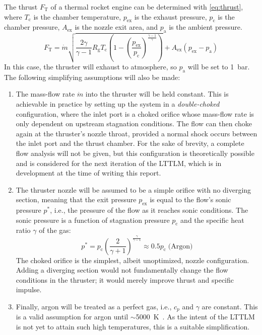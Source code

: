         The thrust $F_\mathrm{T}$ of a thermal rocket engine can be determined with \autoref{eq:thrust}, where $T_\mathrm{c}$ is the chamber temperature, $p_\mathrm{ex}$ is the exhaust pressure, $p_\mathrm{c}$ is the chamber pressure, $A_\mathrm{ex}$ is the nozzle exit area, and $p_\mathrm{a}$ is the ambient pressure.
        \begin{equation}
            F_\mathrm{T} = \dot{m}\sqrt{\frac{2\gamma}{\gamma-1}R_\mathrm{g}T_\mathrm{c}\left(1-\left(\frac{p_\mathrm{ex}}{p_\mathrm{c}}\right)^\frac{\gamma-1}{\gamma}\right)} + A_\mathrm{ex}(p_\mathrm{ex}-p_\mathrm{a}) \label{eq:thrust}
        \end{equation}
        In this case, the thruster will exhaust to atmosphere, so $p_\mathrm{a}$ will be set to \qty{1}{bar}. The following simplifying assumptions will also be made:
        \begin{enumerate}
            \item The mass-flow rate $\dot{m}$ into the thruster will be held constant. This is achievable in practice by setting up the system in a \emph{double-choked} configuration, where the inlet port is a choked orifice whose mass-flow rate is only dependent on upstream stagnation conditions.
                The flow can then choke again at the thruster's nozzle throat, provided a normal shock occurs between the inlet port and the thrust chamber. For the sake of brevity, a complete flow analysis will not be given, but this configuration is theoretically possible and is considered for the next iteration of the LTTLM, which is in development at the time of writing this report.
            \item The thruster nozzle will be assumed to be a simple orifice with no diverging section, meaning that the exit pressure $p_\mathrm{ex}$ is equal to the flow's sonic pressure $p^*$, i.e., the pressure of the flow as it reaches sonic conditions. The sonic pressure is a function of stagnation pressure $p_\mathrm{c}$ and the specific heat ratio $\gamma$ of the gas:
            \begin{equation}p^* = p_\mathrm{c}\left(\frac{2}{\gamma+1}\right)^\frac{\gamma}{\gamma-1} \approx 0.5p_\mathrm{c}\;\text{(Argon)}\label{eq:sonicpressure}\end{equation}
            The choked orifice is the simplest, albeit unoptimized, nozzle configuration. Adding a diverging section would not fundamentally change the flow conditions in the thruster; it would merely improve thrust and specific impulse.
            \item Finally, argon will be treated as a perfect gas, i.e., $c_p$ and $\gamma$ are constant. This is a valid assumption for argon until $\sim$\qty{5000}{K}~\cite{gordonComputerProgramCalculation1994}. As the intent of the LTTLM is not yet to attain such high temperatures, this is a suitable simplification.
        \end{enumerate}

